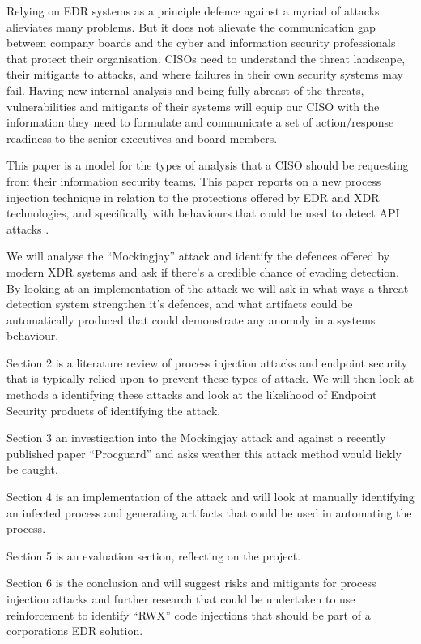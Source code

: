 
Relying on EDR systems as a principle defence against a myriad of attacks alieviates many problems.  But it does not alievate the communication gap between company boards
and the cyber and information security professionals that protect their organisation.  CISOs need to understand the threat landscape, their mitigants to attacks, and
where failures in their own security systems may fail.  Having new internal analysis and being fully abreast of the threats, vulnerabilities and mitigants of their
systems will equip our CISO with the information they need to formulate and communicate a set of action/response readiness to the senior executives and board members. 


This paper is a model for the types of analysis that a CISO should be requesting from their information security teams.  This paper reports on a new process injection technique \autocite{Peixoto:2023} in relation to the protections offered by EDR and XDR technologies, and specifically with behaviours that could be used to detect API attacks \autocite{Wang:2022}.

We will analyse the ``Mockingjay'' attack and identify the defences offered by modern XDR systems and ask if there's a credible chance of evading detection.  By looking at an implementation of the attack we will ask in what ways a threat detection system strengthen it's defences, and what artifacts could be automatically produced that could demonstrate any anomoly in a systems behaviour. 

Section 2 is a literature review of process injection attacks and endpoint security that is typically relied upon to prevent these types of attack.  We will then look at methods a identifying these attacks and look at the likelihood of Endpoint Security products of identifying the attack.

Section 3 an investigation into the Mockingjay attack and against a recently published paper ``Procguard'' \autocite{Wang:2022} and asks weather this attack method would lickly be caught.


Section 4 is an implementation of the attack and will look at manually identifying an infected process and generating artifacts that could be used in automating the process.

Section 5 is an evaluation section, reflecting on the project.

Section 6 is the conclusion and will suggest risks and mitigants for process injection attacks and further research that could be undertaken to use reinforcement to identify ``RWX'' code injections that should be part of a corporations EDR solution.

